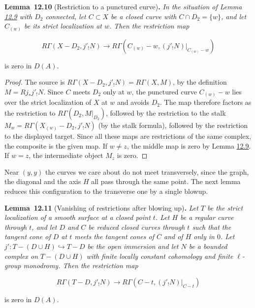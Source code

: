\documentclass[11pt]{article}
\newenvironment{bpstatement}[2]{\par\addvspace{0.6\baselineskip}\noindent\textbf{#1}#2\textbf{.}\enspace\ignorespaces}
  {\par\addvspace{0.4\baselineskip}}
\newenvironment{bpstatementit}[2]{\begin{bpstatement}{#1}{#2}\itshape\ignorespaces}{\end{bpstatement}}
\begin{document}
\label{bp256}%
\begin{bpstatementit}{Lemma~12.10}{ (Restriction to a punctured curve)}
In the situation of Lemma \hyperref[bp253]{12.9} with \(D_2\) connected, let \(C\subset X\) be a closed curve with \(C\cap D_2=\{w\}\), and let \(C_{(w)}\) be its strict localization at \(w\). Then the restriction map

\[
R\Gamma(X-D_2,j'_!N)\longrightarrow
R\Gamma(C_{(w)}-w,(j'_!N)|_{C_{(w)}-w})
\]

is zero in \(D(A)\).
\end{bpstatementit}

\begin{proof}[{Proof}]\label{bp257}%
The source is \(R\Gamma(X-D_2,j'_!N)=R\Gamma(X,M)\), by the definition \(M=Rj_*j'_!N\). Since \(C\) meets \(D_2\) only at \(w\), the punctured curve \(C_{(w)}-w\) lies over the strict localization of \(X\) at \(w\) and avoids \(D_2\). The map therefore factors as the restriction to \(R\Gamma(D_2,M|_{D_2})\), followed by the restriction to the stalk \(M_w=R\Gamma(X_{(w)}-D_2,j'_!N)\) (by the stalk formula), followed by the restriction to the displayed target. Since all these maps are restrictions of the same complex, the composite is the given map. If \(w\ne z\), the middle map is zero by Lemma \hyperref[bp253]{12.9}. If \(w=z\), the intermediate object \(M_z\) is zero.
\end{proof}

\label{bp258}%
Near \((y,y)\) the curves we care about do not meet transversely, since the graph, the diagonal and the axis \(H\) all pass through the same point. The next lemma reduces this configuration to the transverse one by a single blowup.

\label{bp259}%
\begin{bpstatementit}{Lemma~12.11}{ (Vanishing of restrictions after blowing up)}
Let \(T\) be the strict localization of a smooth surface at a closed point \(t\). Let \(H\) be a regular curve through \(t\), and let \(D\) and \(C\) be reduced closed curves through \(t\) such that the tangent cone of \(D\) at \(t\) meets the tangent cones of \(C\) and of \(H\) only in \(0\). Let \(j':T-(D\cup H)\hookrightarrow T-D\) be the open immersion and let \(N\) be a bounded complex on \(T-(D\cup H)\) with finite locally constant cohomology and finite \(\ell\)-group monodromy. Then the restriction map

\[
R\Gamma(T-D,j'_!N)\longrightarrow
R\Gamma(C-t,(j'_!N)|_{C-t})
\]

is zero in \(D(A)\).
\end{bpstatementit}
\end{document}

